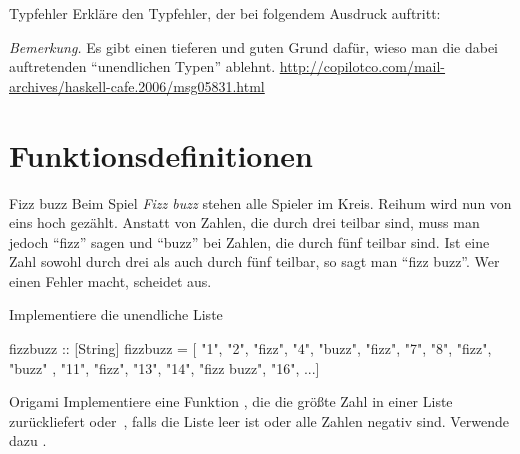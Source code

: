 \documentclass{uebblatt}
\begin{document}
\begin{aufgabe}{Typfehler}
  Erkläre den Typfehler, der bei folgendem Ausdruck auftritt: 

  {\scriptsize\emph{Bemerkung.} Es gibt einen tieferen und guten Grund dafür, wieso man die dabei auftretenden "`unendlichen Typen"' ablehnt. \url{http://copilotco.com/mail-archives/haskell-cafe.2006/msg05831.html}\par}
\end{aufgabe}


\section{Funktionsdefinitionen}

\begin{aufgabe}{Fizz buzz}
  Beim Spiel \emph{Fizz buzz} stehen alle Spieler im Kreis. Reihum wird nun von eins hoch gezählt. Anstatt von Zahlen, die durch drei teilbar sind, muss man jedoch "`fizz"' sagen und "`buzz"' bei Zahlen, die durch fünf teilbar sind. Ist eine Zahl sowohl durch drei als auch durch fünf teilbar, so sagt man "`fizz buzz"'. Wer einen Fehler macht, scheidet aus.
  
  Implementiere die unendliche Liste
  \begin{haskellcode}
fizzbuzz :: [String]
fizzbuzz = [ "1", "2", "fizz", "4", "buzz", "fizz", "7", "8", "fizz", "buzz"
           , "11", "fizz", "13", "14", "fizz buzz", "16", ...]
  \end{haskellcode}
\end{aufgabe}

\begin{aufgabe}{Origami}
  Implementiere eine Funktion , die die größte Zahl in einer Liste zurückliefert oder~, falls die Liste leer ist oder alle Zahlen negativ sind. Verwende dazu .
\end{aufgabe}
\end{document}
